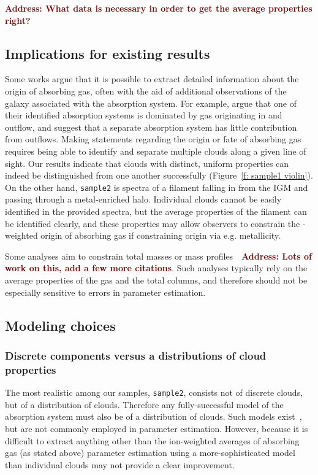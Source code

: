 \documentclass[fleqn,usenatbib]{mnras}
\newcommand{\todo}[1]{\textcolor{Maroon}{\textbf{Address: #1}}}
\begin{document}
\todo{What data is necessary in order to get the average properties right?}

\subsection{Implications for existing results}

Some works argue that it is possible to extract detailed information about the origin of absorbing gas, often with the aid of additional observations of the galaxy associated with the absorption system.
For example, \cite{Peroux2013} argue that one of their identified absorption systems is dominated by gas originating in and outflow, and \cite{Peroux2017} suggest that a separate absorption system has little contribution from outflows.
Making statements regarding the origin or fate of absorbing gas requires being able to identify and separate multiple clouds along a given line of sight.
Our results indicate that clouds with distinct, uniform properties can indeed be distinguished from one another successfully (Figure~\ref{f: sample1 violin}).
On the other hand, \texttt{sample2} is spectra of a filament falling in from the IGM and passing through a metal-enriched halo.
Individual clouds cannot be easily identified in the provided spectra,
but the average properties of the filament can be identified clearly,
and these properties may allow observers to constrain the -weighted origin of absorbing gas if constraining origin via e.g. metallicity.

Some analyses aim to constrain total masses or mass profiles~\citep[e.g.][]{Zahedy2019a}~\todo{Lots of work on this, add a few more citations}.
Such analyses typically rely on the average properties of the gas and the total columns,
and therefore should not be especially sensitive to errors in parameter estimation.

\subsection{Modeling choices}

\subsubsection{Discrete components versus a distributions of cloud properties}

The most realistic among our samples, \texttt{sample2}, consists not of discrete clouds, but of a distribution of clouds.
Therefore any fully-successful model of the absorption system must also be of a distribution of clouds.
Such models exist~\citep[e.g.][]{stern2016Universal}, but are not commonly employed in parameter estimation.
However, because it is difficult to extract anything other than the ion-weighted averages of absorbing gas (as stated above) parameter estimation using a more-sophisticated model than individual clouds may not provide a clear improvement.
\end{document}
